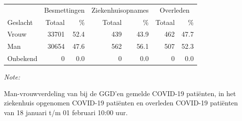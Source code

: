\documentclass[
  english,
  man,floatsintext]{apa6}
\begin{document}
\begin{table}[H]
\centering\begingroup\fontsize{11}{13}\selectfont

\begin{threeparttable}
\begin{tabular}{lrrrrrr}
\toprule
\multicolumn{1}{c}{ } & \multicolumn{2}{c}{Besmettingen} & \multicolumn{2}{c}{Ziekenhuisopnames} & \multicolumn{2}{c}{Overleden} \\
\cmidrule(l{3pt}r{3pt}){2-3} \cmidrule(l{3pt}r{3pt}){4-5} \cmidrule(l{3pt}r{3pt}){6-7}
Geslacht & Totaal & \% & Totaal & \% & Totaal & \%\\
\midrule
Vrouw & 33701 & 52.4 & 439 & 43.9 & 462 & 47.7\\
Man & 30654 & 47.6 & 562 & 56.1 & 507 & 52.3\\
Onbekend & 0 & 0.0 & 0 & 0.0 & 0 & 0.0\\
\bottomrule
\end{tabular}
\begin{tablenotes}
\item \textit{Note: } 
\item Man-vrouwverdeling van bij de GGD’en gemelde COVID-19 patiënten, in het ziekenhuis opgenomen COVID-19 patiënten en overleden COVID-19 patiënten van 18 januari t/m 01 februari 10:00 uur.
\end{tablenotes}
\end{threeparttable}
\endgroup{}
\end{table}
\newpage
\end{document}
